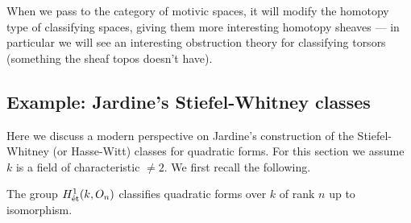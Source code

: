 \documentclass[11pt,openany]{book}
\begin{document}
When we pass to the category of motivic spaces, it will modify the homotopy type of classifying spaces, giving them more interesting homotopy sheaves --- in particular we will see an interesting obstruction theory for classifying torsors (something the sheaf topos doesn't have).


\subsection{Example: Jardine's Stiefel-Whitney classes}

Here we discuss a modern perspective on Jardine's construction of the Stiefel-Whitney (or Hasse-Witt) classes for quadratic forms. For this section we assume $k$ is a field of characteristic $\ne 2$. We first recall the following.

\begin{proposition} The group $H^1_{\text{\'{e}t}}(k,O_n)$ classifies quadratic forms over $k$ of rank $n$ up to isomorphism.
\end{proposition}
\end{document}
